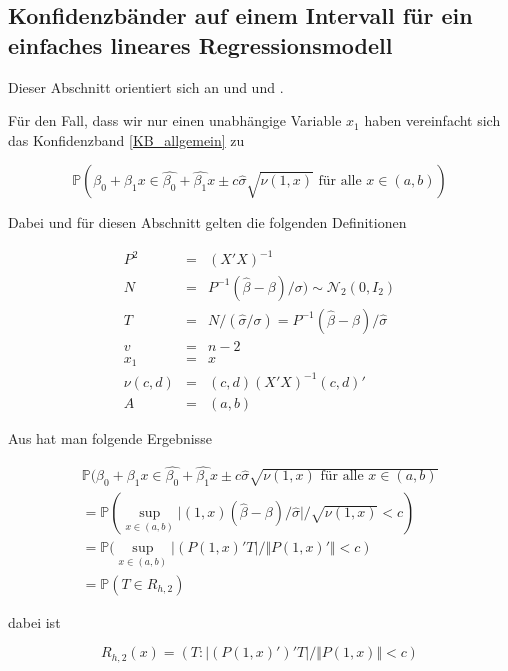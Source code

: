 \documentclass[12pt,a4paper]{article}
\theoremstyle{definition}
\theoremstyle{definition}
\theoremstyle{definition}
\begin{document}
\subsection{Konfidenzbänder auf einem Intervall für ein einfaches lineares Regressionsmodell}
\label{Konfidenzbänder auf einem Intervall für ein einfaches lineares Regressionsmodell}
Dieser Abschnitt orientiert sich an \cite[17-23]{Liu64} und \cite{Liu08} und \cite{Wynn71}.

Für den Fall, dass wir nur einen unabhängige Variable $x_1$ haben vereinfacht sich das Konfidenzband \ref{KB_allgemein} zu

\begin{equation}\label{simple_KB}
\mathbb{P}(\beta_0 + \beta_1 x \in \hat{\beta_0} + \hat{\beta_1} x \pm c \hat{\sigma} \sqrt{\nu(1,x)}  \text{ für alle } x \in (a,b) )
\end{equation}

Dabei und für diesen Abschnitt gelten die folgenden Definitionen

\begin{eqnarray*}
P^2 &=& (X'X)^{-1} \\
N &=& P^{-1} (\hat{\beta} - \beta)/\sigma) \sim \mathscr{N}_2(0,I_2) \\
T &=& N / (\hat{\sigma} / \sigma) = P^{-1} (\hat{\beta}-\beta) / \hat{\sigma} \\
v &=& n-2 \\
x_1 &=& x \\
\nu(c,d) &=& (c,d) (X'X)^{-1} (c,d)' \\
A &=&(a,b)
\end{eqnarray*}

Aus \cite[19-20]{Liu64} hat man folgende Ergebnisse

\begin{eqnarray*}
\mathbb{P}(\beta_0 + \beta_1 x \in \hat{\beta_0} + \hat{\beta_1} x \pm c \hat{\sigma} \sqrt{\nu(1,x)  \text{ für alle } x \in (a,b) } \\
= \mathbb{P} (\sup_{x \in (a,b)} \vert (1,x) ( \hat{\beta} - \beta ) / \hat{\sigma} \vert / \sqrt{\nu(1,x)} < c) \\
= \mathbb{P} (\sup_{x \in (a,b)} \vert (P(1,x)'T \vert / \Vert P (1,x)' \Vert < c) \\
= \mathbb{P} (T \in R_{h,2})
\end{eqnarray*}

dabei ist

\begin{equation*}
R_{h,2}(x) = ( T : \vert (P (1,x)' )' T \vert / \Vert P (1,x) \Vert < c)
\end{equation*}
\end{document}
